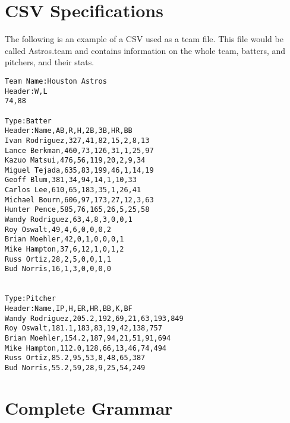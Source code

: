 \section{CSV Specifications}\label{csv} 
The following is an example of a CSV used as a team file. This file
would be called Astros.team and contains information on the whole
team, batters, and pitchers, and their stats.
\small
\begin{singlespace}
\begin{verbatim}
Team Name:Houston Astros
Header:W,L
74,88

Type:Batter
Header:Name,AB,R,H,2B,3B,HR,BB
Ivan Rodriguez,327,41,82,15,2,8,13
Lance Berkman,460,73,126,31,1,25,97
Kazuo Matsui,476,56,119,20,2,9,34
Miguel Tejada,635,83,199,46,1,14,19
Geoff Blum,381,34,94,14,1,10,33
Carlos Lee,610,65,183,35,1,26,41
Michael Bourn,606,97,173,27,12,3,63
Hunter Pence,585,76,165,26,5,25,58
Wandy Rodriguez,63,4,8,3,0,0,1
Roy Oswalt,49,4,6,0,0,0,2
Brian Moehler,42,0,1,0,0,0,1
Mike Hampton,37,6,12,1,0,1,2
Russ Ortiz,28,2,5,0,0,1,1
Bud Norris,16,1,3,0,0,0,0


Type:Pitcher
Header:Name,IP,H,ER,HR,BB,K,BF
Wandy Rodriguez,205.2,192,69,21,63,193,849
Roy Oswalt,181.1,183,83,19,42,138,757
Brian Moehler,154.2,187,94,21,51,91,694
Mike Hampton,112.0,128,66,13,46,74,494
Russ Ortiz,85.2,95,53,8,48,65,387
Bud Norris,55.2,59,28,9,25,54,249
\end{verbatim}
\end{singlespace}
\normalsize


\section{Complete Grammar}\label{grammar}


